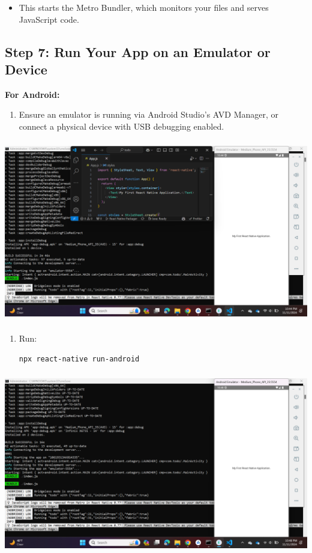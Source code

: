 \documentclass{article}
\begin{document}
\begin{itemize}
    \item This starts the Metro Bundler, which monitors your files and serves JavaScript code.
\end{itemize}


\subsection*{Step 7: Run Your App on an Emulator or Device}

\textbf{For Android:}
\begin{enumerate}
    \item Ensure an emulator is running via Android Studio’s AVD Manager, or connect a physical device with USB debugging enabled.
\end{enumerate}
\includegraphics[width=5.57813in,height=3.13391in]{media/image7.png}
    
\begin{enumerate}   
    \item Run:
    \begin{lstlisting}[language=bash]
    npx react-native run-android
    \end{lstlisting}
\end{enumerate}
\includegraphics[width=5.57813in,height=3.13391in]{media/image32.png}
\end{document}
